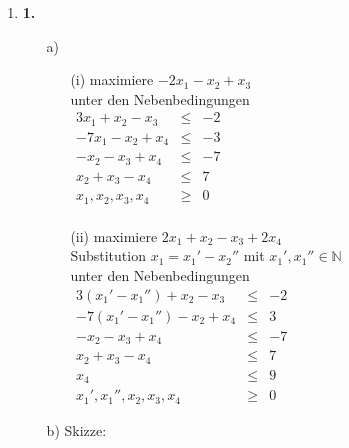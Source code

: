 \documentclass[a4paper,11pt]{article}
\author{\authorinfo}
\title{\titleinfo}
\date{\today}
\begin{document}
\maketitle
\begin {enumerate}
\item[\textbf{1.}]
    \begin{enumerate}
    \item[a)]
        \begin{enumerate}
        \item[(i)]
            maximiere \(-2x_1-x_2+x_3\) \\
            unter den Nebenbedingungen \\
            \(\begin{array}{rcr}
                3x_1 + x_2 - x_3 & \leq & -2 \\
                - 7x_1 - x_2 + x_4 & \leq & -3 \\
                - x_2 - x_3 + x_4 & \leq & - 7 \\
                x_2 + x_3 - x_4 & \leq & 7 \\
                x_1,x_2,x_3,x_4 & \geq & 0 \\
            \end{array}\)

        \item[(ii)]
            maximiere \(2x_1+x_2-x_3+2x_4\) \\
            Substitution \(x_1 = x_1'-x_2''\) mit \(x_1', x_1'' \in \mathbb{N} \) \\
            unter den Nebenbedingungen \\
            \(\begin{array}{rcr}
                3(x_1'-x_1'') + x_2 - x_3 & \leq & -2 \\
                -7(x_1'-x_1'') - x_2 + x_4 & \leq & 3 \\
                - x_2 - x_3 + x_4 & \leq & -7 \\
                x_2 + x_3 - x_4 & \leq & 7 \\
                x_4 & \leq & 9 \\
                x_1',x_1'',x_2,x_3,x_4 & \geq & 0
            \end{array}\)
        \end{enumerate}

    \item[b)]
        Skizze:


\end{enumerate}
\end{enumerate}
\end{document}
